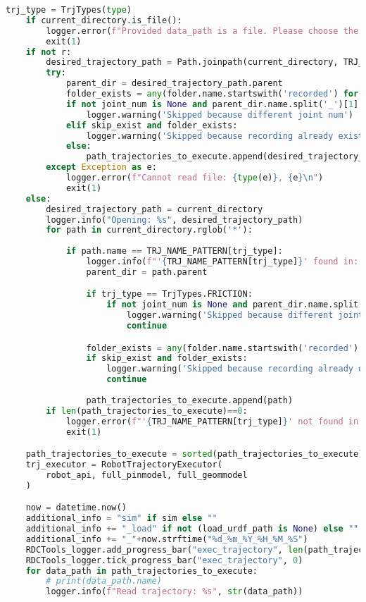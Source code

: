 \begin{lstlisting}[language=python, caption=\raggedright{execution/exec\_trajectory.py}, frame=single]
    trj_type = TrjTypes(type)
    if current_directory.is_file():
        logger.error(f"Provided data_path is a file. Please choose the directory with trajectory\n")
        exit(1)
    if not r:
        desired_trajectory_path = Path.joinpath(current_directory, TRJ_NAME_PATTERN[trj_type])
        try:
            parent_dir = desired_trajectory_path.parent
            folder_exists = any(folder.name.startswith('recorded') for folder in parent_dir.iterdir() if folder.is_dir())
            if not joint_num is None and parent_dir.name.split('_')[1] != str(joint_num):
                logger.warning('Skipped because different joint num')
            elif skip_exist and folder_exists:
                logger.warning('Skipped because recording already exists')
            else:
                path_trajectories_to_execute.append(desired_trajectory_path)
        except Exception as e:
            logger.error(f"Cannot read file: {type(e)}, {e}\n")
            exit(1)
    else:
        desired_trajectory_path = current_directory
        logger.info("Opening: %s", desired_trajectory_path)
        for path in current_directory.rglob('*'):
            
            if path.name == TRJ_NAME_PATTERN[trj_type]:
                logger.info(f"'{TRJ_NAME_PATTERN[trj_type]}' found in: {path.parent}")
                parent_dir = path.parent

                if trj_type == TrjTypes.FRICTION:
                    if not joint_num is None and parent_dir.name.split('_')[1] != str(joint_num):
                        logger.warning('Skipped because different joint num')
                        continue 

                folder_exists = any(folder.name.startswith('recorded') for folder in parent_dir.iterdir() if folder.is_dir())
                if skip_exist and folder_exists:
                    logger.warning('Skipped because recording already exists')
                    continue
                
                path_trajectories_to_execute.append(path)
        if len(path_trajectories_to_execute)==0:
            logger.error(f"'{TRJ_NAME_PATTERN[trj_type]}' not found in subfolders of: {desired_trajectory_path}")
            exit(1)

    path_trajectories_to_execute = sorted(path_trajectories_to_execute)
    trj_executor = RobotTrajectoryExecutor(
        robot_api, full_pinmodel, full_geommodel
    )

    now = datetime.now()
    additional_info = "sim" if sim else ""
    additional_info += "_load" if not (load_urdf_path is None) else ""
    additional_info += "_"+now.strftime("%d_%m_%Y_%H_%M_%S")
    RDCTools_logger.add_progress_bar("exec_trajectory", len(path_trajectories_to_execute), "Execute trajectories", "traj")
    RDCTools_logger.tick_progress_bar("exec_trajectory", 0)
    for data_path in path_trajectories_to_execute:
        # print(data_path.name)
        logger.info(f"Read trajectory: %s", str(data_path))


\end{lstlisting}
